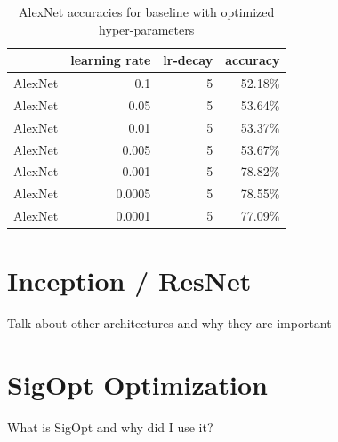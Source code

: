 \begin{table}[t] \centering
{}
\caption{AlexNet accuracies for baseline with optimized hyper-parameters}
\begin{tabular}{@{}rrrr@{}}
\toprule & learning rate & lr-decay & accuracy \\
\midrule
AlexNet		& 0.1 		& 5		& 52.18\%  \\
AlexNet		& 0.05 		& 5		& 53.64\%  \\
AlexNet		& 0.01 		& 5		& 53.37\%  \\
AlexNet		& 0.005 		& 5		& 53.67\%  \\
AlexNet		& 0.001 		& 5		& 78.82\%  \\
AlexNet		& 0.0005 		& 5		& 78.55\%  \\
AlexNet		& 0.0001 		& 5		& 77.09\%  \\
\bottomrule
\end{tabular}
\label{tbl:similarity-test-map}
\end{table}


\section{Inception / ResNet}

Talk about other architectures and why they are important

\section{SigOpt Optimization}

What is SigOpt and why did I use it?
